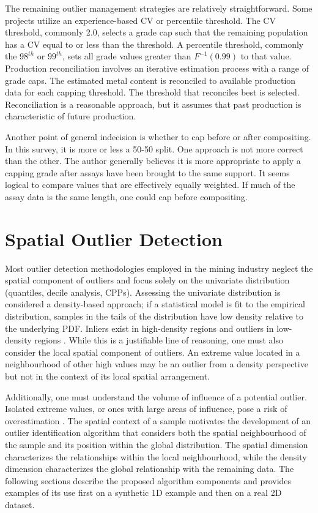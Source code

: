 The remaining outlier management strategies are relatively straightforward. Some projects utilize an experience-based \gls{CV} or percentile threshold. The \gls{CV} threshold, commonly 2.0, selects a grade cap such that the remaining population has a \gls{CV} equal to or less than the threshold. A percentile threshold, commonly the $98^{th}$ or $99^{th}$, sets all grade values greater than $F^{-1}(0.99)$ to that value. Production reconciliation involves an iterative estimation process with a range of grade caps. The estimated metal content is reconciled to available production data for each capping threshold. The threshold that reconciles best is selected. Reconciliation is a reasonable approach, but it assumes that past production is characteristic of future production.

Another point of general indecision is whether to cap before or after compositing. In this survey, it is more or less a 50-50 split. One approach is not more correct than the other. The author generally believes it is more appropriate to apply a capping grade after assays have been brought to the same support. It seems logical to compare values that are effectively equally weighted. If much of the assay data is the same length, one could cap before compositing.

\FloatBarrier
\section{Spatial Outlier Detection}
\label{sec:02spatial}

Most outlier detection methodologies employed in the mining industry neglect the spatial component of outliers and focus solely on the univariate distribution (quantiles, decile analysis, \glspl{CPP}). Assessing the univariate distribution is considered a density-based approach; if a statistical model is fit to the empirical distribution, samples in the tails of the distribution have low density relative to the underlying \gls{PDF}. Inliers exist in high-density regions and outliers in low-density regions \citep{geron2019hands}. While this is a justifiable line of reasoning, one must also consider the local spatial component of outliers. An extreme value located in a neighbourhood of other high values may be an outlier from a density perspective but not in the context of its local spatial arrangement.

Additionally, one must understand the volume of influence of a potential outlier. Isolated extreme values, or ones with large areas of influence, pose a risk of overestimation \citep{leuangthong2015dealing}. The spatial context of a sample motivates the development of an outlier identification algorithm that considers both the spatial neighbourhood of the sample and its position within the global distribution. The spatial dimension characterizes the relationships within the local neighbourhood, while the density dimension characterizes the global relationship with the remaining data. The following sections describe the proposed algorithm components and provides examples of its use first on a synthetic \gls{1D} example and then on a real \gls{2D} dataset.

